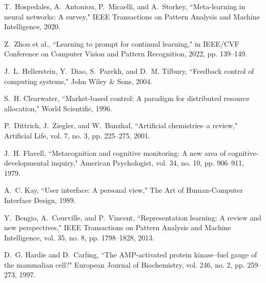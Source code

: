 \documentclass[journal,onecolumn]{IEEEtran}
\begin{document}
\begin{thebibliography}{00}
T.~Hospedales, A.~Antoniou, P.~Micaelli, and A.~Storkey, ``Meta-learning in neural networks: A survey," IEEE Transactions on Pattern Analysis and Machine Intelligence, 2020.

Z.~Zhou et al., ``Learning to prompt for continual learning," in IEEE/CVF Conference on Computer Vision and Pattern Recognition, 2022, pp. 139--149.

J.~L. Hellerstein, Y.~Diao, S.~Parekh, and D.~M. Tilbury, ``Feedback control of computing systems," John Wiley \& Sons, 2004.

S.~H. Clearwater, ``Market-based control: A paradigm for distributed resource allocation," World Scientific, 1996.

P.~Dittrich, J.~Ziegler, and W.~Banzhaf, ``Artificial chemistries--a review," Artificial Life, vol. 7, no. 3, pp. 225--275, 2001.

J.~H. Flavell, ``Metacognition and cognitive monitoring: A new area of cognitive-developmental inquiry," American Psychologist, vol. 34, no. 10, pp. 906--911, 1979.

A.~C. Kay, ``User interface: A personal view," The Art of Human-Computer Interface Design, 1989.

Y.~Bengio, A.~Courville, and P.~Vincent, ``Representation learning: A review and new perspectives," IEEE Transactions on Pattern Analysis and Machine Intelligence, vol. 35, no. 8, pp. 1798--1828, 2013.

D.~G. Hardie and D.~Carling, ``The AMP-activated protein kinase--fuel gauge of the mammalian cell?" European Journal of Biochemistry, vol. 246, no. 2, pp. 259--273, 1997.

\end{thebibliography}
\end{document}
